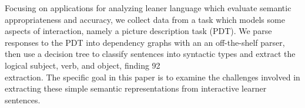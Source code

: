 Focusing on applications for analyzing leaner language which evaluate semantic appropriateness and accuracy, we collect data from a task which models some
 aspects of interaction, namely a picture description task (PDT).  We parse
 responses to the PDT into dependency graphs with an an off-the-shelf parser,
 then use a decision tree to classify sentences into syntactic types and extract
 the logical subject, verb, and object, finding 92\\%
 extraction. The specific goal in this paper is to examine the challenges
 involved in extracting these simple semantic representations from interactive
 learner sentences.

